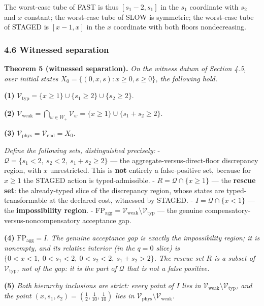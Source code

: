 \documentclass[11pt]{article}
\begin{document}
The worst-case tube of FAST is thus \([s_1 - 2, s_1]\) in the \(s_1\)
coordinate with \(s_2\) and \(x\) constant; the worst-case tube of SLOW
is symmetric; the worst-case tube of STAGED is \([x - 1, x]\) in the
\(x\) coordinate with both floors nondecreasing.

\subsubsection{4.6 Witnessed separation}\label{witnessed-separation}

\textbf{Theorem 5 (witnessed separation).} \emph{On the witness datum of
Section 4.5, over initial states
\(X_0 = \{(0, x, s) : x \ge 0, s \ge 0\}\), the following hold.}

\textbf{(1)}
\(\mathcal{V}_{\mathrm{typ}} = \{ x \ge 1 \} \cup \{ s_1 \ge 2 \} \cup \{ s_2 \ge 2 \}.\)

\textbf{(2)}
\(\mathcal{V}_{\mathrm{weak}} = \bigcap_{w \in W_+} \mathcal{V}_w = \{ x \ge 1 \} \cup \{ s_1 + s_2 \ge 2 \}.\)

\textbf{(3)}
\(\mathcal{V}_{\mathrm{phys}} = \mathcal{V}_{\mathrm{end}} = X_0.\)

\emph{Define the following sets, distinguished precisely:} -
\(\mathcal{Q} = \{ s_1 < 2,\ s_2 < 2,\ s_1 + s_2 \ge 2 \}\) --- the
aggregate-versus-direct-floor discrepancy region, with \(x\)
unrestricted. This is \textbf{not} entirely a false-positive set,
because for \(x \ge 1\) the STAGED action is typed-admissible. -
\(R = \mathcal{Q} \cap \{ x \ge 1 \}\) --- the \textbf{rescue set}: the
already-typed slice of the discrepancy region, whose states are
typed-transformable at the declared cost, witnessed by STAGED. -
\(I = \mathcal{Q} \cap \{ x < 1 \}\) --- the \textbf{impossibility
region}. -
\(\mathrm{FP}_{\mathrm{agg}} = \mathcal{V}_{\mathrm{weak}} \setminus \mathcal{V}_{\mathrm{typ}}\)
--- the genuine compensatory-versus-noncompensatory acceptance gap.

\textbf{(4)} \(\mathrm{FP}_{\mathrm{agg}} = I.\) \emph{The genuine
acceptance gap is exactly the impossibility region; it is nonempty, and
its relative interior (in the \(q = 0\) slice) is
\(\{ 0 < x < 1,\ 0 < s_1 < 2,\ 0 < s_2 < 2,\ s_1 + s_2 > 2 \}\). The
rescue set \(R\) is a subset of \(\mathcal{V}_{\mathrm{typ}}\), not of
the gap: it is the part of \(\mathcal{Q}\) that is not a false
positive.}

\textbf{(5)} \emph{Both hierarchy inclusions are strict: every point of
\(I\) lies in
\(\mathcal{V}_{\mathrm{weak}} \setminus \mathcal{V}_{\mathrm{typ}}\),
and the point \((x, s_1, s_2) = (\tfrac12, \tfrac1{10}, \tfrac1{10})\)
lies in
\(\mathcal{V}_{\mathrm{phys}} \setminus \mathcal{V}_{\mathrm{weak}}\).}
\end{document}
